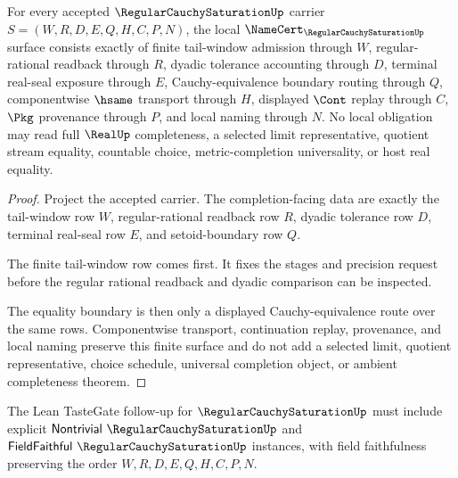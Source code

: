 \begin{theorem}
\label{thm:regular-cauchy-saturation-namecert-obligations}
For every accepted $\RegularCauchySaturationUp$ carrier $S=(W,R,D,E,Q,H,C,P,N)$, the local $\NameCert_{\RegularCauchySaturationUp}$ surface consists exactly of finite tail-window admission through $W$, regular-rational readback through $R$, dyadic tolerance accounting through $D$, terminal real-seal exposure through $E$, Cauchy-equivalence boundary routing through $Q$, componentwise $\hsame$ transport through $H$, displayed $\Cont$ replay through $C$, $\Pkg$ provenance through $P$, and local naming through $N$. No local obligation may read full $\RealUp$ completeness, a selected limit representative, quotient stream equality, countable choice, metric-completion universality, or host real equality.
\end{theorem}
\begin{proof}
Project the accepted carrier. The completion-facing data are exactly the tail-window row $W$, regular-rational readback row $R$, dyadic tolerance row $D$, terminal real-seal row $E$, and setoid-boundary row $Q$.

The finite tail-window row comes first. It fixes the stages and precision request before the regular rational readback and dyadic comparison can be inspected.

The equality boundary is then only a displayed Cauchy-equivalence route over the same rows. Componentwise transport, continuation replay, provenance, and local naming preserve this finite surface and do not add a selected limit, quotient representative, choice schedule, universal completion object, or ambient completeness theorem.
\end{proof}



The Lean TasteGate follow-up for $\RegularCauchySaturationUp$ must include explicit $\mathsf{Nontrivial}\ \RegularCauchySaturationUp$ and $\mathsf{FieldFaithful}\ \RegularCauchySaturationUp$ instances, with field faithfulness preserving the order $W,R,D,E,Q,H,C,P,N$.

